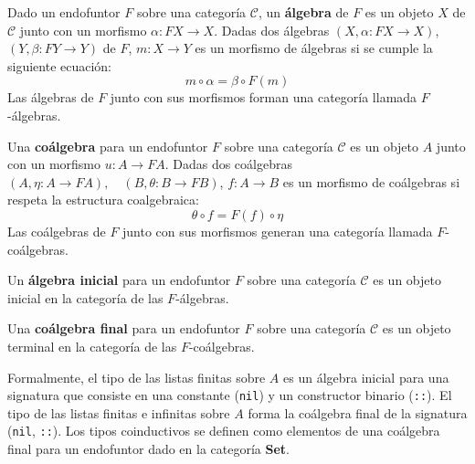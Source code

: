 \begin{definition}
Dado un endofuntor $\mathit{F}$ sobre una categoría $\mathscr{C}$, un \textbf{álgebra} de $\mathit{F}$ es un objeto $X$ de $\mathscr{C}$ junto con un morfismo $\alpha : \mathit{F}X \rightarrow X$. Dadas dos álgebras $(X, \alpha : \mathit{F}X \rightarrow X)$, $(Y, \beta : \mathit{F}Y \rightarrow Y)$ de $F$, $m : X \rightarrow Y$ es un morfismo de álgebras si se cumple la siguiente ecuación:
\begin{equation*}
m \circ \alpha = \beta \circ \mathit{F}(m)
\end{equation*}
Las álgebras de $\mathit{F}$ junto con sus morfismos forman una categoría llamada $\mathit{F}$-álgebras. 
\end{definition}

\begin{definition}
Una \textbf{coálgebra} para un endofuntor $\mathit{F}$ sobre una categoría $\mathscr{C}$ es un objeto $A$ junto con un morfismo $u : A \rightarrow \mathit{F} A$. Dadas dos coálgebras $(A, \eta : A \rightarrow \mathit{F}A), \quad (B, \theta : B \rightarrow \mathit{F}B)$, $f : A \rightarrow B$ es un morfismo de coálgebras si respeta la estructura coalgebraica: 
\begin{equation*}
\theta \circ f = \mathit{F}(f) \circ \eta
\end{equation*} 
Las coálgebras de $\mathit{F}$ junto con sus morfismos generan una categoría llamada $\mathit{F}$-coálgebras.
\end{definition}

\begin{definition}
Un \textbf{álgebra inicial} para un endofuntor $\mathit{F}$ sobre una categoría $\mathscr{C}$ es un objeto inicial en la categoría de las $\mathit{F}$-álgebras.
\end{definition}

\begin{definition}
Una \textbf{coálgebra final} para un endofuntor $\mathit{F}$ sobre una categoría $\mathscr{C}$ es un objeto terminal en la categoría de las $\mathit{F}$-coálgebras. 
\end{definition}

Formalmente, el tipo de las listas finitas sobre $A$ es un álgebra inicial para una signatura que consiste en una constante (\texttt{nil}) y un constructor binario (\texttt{::}). El tipo de las listas finitas e infinitas sobre $A$ forma la coálgebra final de la signatura (\texttt{nil}, \texttt{::}). Los tipos coinductivos se definen como elementos de una coálgebra final para un endofuntor dado en la categoría \textbf{Set}. 

